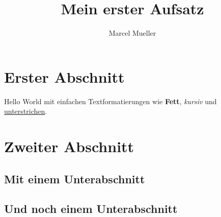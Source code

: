 \documentclass[12pt,a4paper,final,twocolumn]{article}
\author{Marcel Mueller}
\title{Mein erster Aufsatz}
\begin{document}
	\maketitle
	\tableofcontents
	\section{Erster Abschnitt}
	Hello World mit einfachen Textformatierungen wie \textbf{Fett}, \textit{kursiv} und \underline{unterstrichen}. 
	\section{Zweiter Abschnitt}
	\blindtext
	\subsection{Mit einem Unterabschnitt}
	\blindtext
	\subsection{Und noch einem Unterabschnitt}
	\blindtext
\end{document}
